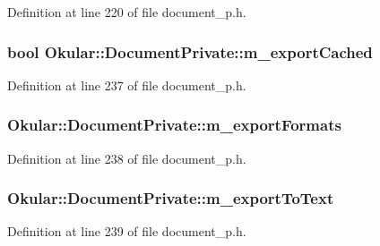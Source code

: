 Definition at line 220 of file document\+\_\+p.\+h.

\hypertarget{classOkular_1_1DocumentPrivate_ad738776539c25a2b18b0d482c406b424}{
\subsubsection[{m\+\_\+export\+Cached}]{\setlength{\rightskip}{0pt plus 5cm}bool Okular\+::\+Document\+Private\+::m\+\_\+export\+Cached}}\label{classOkular_1_1DocumentPrivate_ad738776539c25a2b18b0d482c406b424}


Definition at line 237 of file document\+\_\+p.\+h.

\hypertarget{classOkular_1_1DocumentPrivate_a674e49f7a287a70630bc5550b1a44169}{
\subsubsection[{m\+\_\+export\+Formats}]{ Okular\+::\+Document\+Private\+::m\+\_\+export\+Formats}}\label{classOkular_1_1DocumentPrivate_a674e49f7a287a70630bc5550b1a44169}


Definition at line 238 of file document\+\_\+p.\+h.

\hypertarget{classOkular_1_1DocumentPrivate_a6c71a54787a3a6d6c16f79e2eb77ebbd}{
\subsubsection[{m\+\_\+export\+To\+Text}]{ Okular\+::\+Document\+Private\+::m\+\_\+export\+To\+Text}}\label{classOkular_1_1DocumentPrivate_a6c71a54787a3a6d6c16f79e2eb77ebbd}


Definition at line 239 of file document\+\_\+p.\+h.

